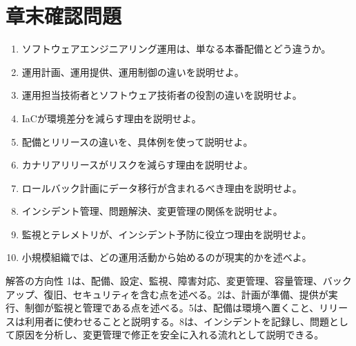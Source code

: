 \documentclass[uplatex,dvipdfmx,a4paper,10pt]{jsarticle}
\begin{document}
\section{章末確認問題}

\begin{enumerate}
  \item ソフトウェアエンジニアリング運用は、単なる本番配備とどう違うか。
  \item 運用計画、運用提供、運用制御の違いを説明せよ。
  \item 運用担当技術者とソフトウェア技術者の役割の違いを説明せよ。
  \item IaCが環境差分を減らす理由を説明せよ。
  \item 配備とリリースの違いを、具体例を使って説明せよ。
  \item カナリアリリースがリスクを減らす理由を説明せよ。
  \item ロールバック計画にデータ移行が含まれるべき理由を説明せよ。
  \item インシデント管理、問題解決、変更管理の関係を説明せよ。
  \item 監視とテレメトリが、インシデント予防に役立つ理由を説明せよ。
  \item 小規模組織では、どの運用活動から始めるのが現実的かを述べよ。
\end{enumerate}

\begin{pointbox}{解答の方向性}
1は、配備、設定、監視、障害対応、変更管理、容量管理、バックアップ、復旧、セキュリティを含む点を述べる。2は、計画が準備、提供が実行、制御が監視と管理である点を述べる。5は、配備は環境へ置くこと、リリースは利用者に使わせることと説明する。8は、インシデントを記録し、問題として原因を分析し、変更管理で修正を安全に入れる流れとして説明できる。
\end{pointbox}
\end{document}
